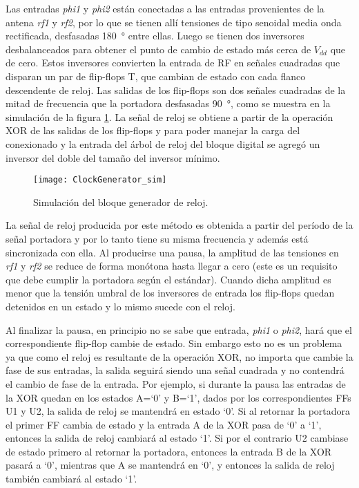 Las entradas \emph{phi1} y \emph{phi2} están conectadas a las entradas 
provenientes de la antena \emph{rf1} y \emph{rf2}, por lo que se 
tienen allí tensiones de tipo senoidal media onda rectificada, 
desfasadas \SI{180}{\degree} entre ellas. Luego se tienen dos 
inversores desbalanceados para obtener el punto de cambio de estado 
más cerca de \(V_{dd}\) que de cero. Estos inversores convierten la 
entrada de RF en señales cuadradas que disparan un par de flip-flops 
T, que cambian de estado con cada flanco descendente de reloj. Las
salidas de los flip-flops son dos señales cuadradas de la mitad de 
frecuencia que la portadora desfasadas \SI{90}{\degree}, como se 
muestra en la simulación de la figura \ref{fig:ClockGeneratorSim}. La 
señal de reloj se obtiene a partir de la operación XOR de las salidas 
de los flip-flops y para poder manejar la carga del conexionado y la 
entrada del árbol de reloj del bloque digital se agregó un inversor 
del doble del tamaño del inversor mínimo.

\begin{figure}
	\centering
	\texttt{[image: ClockGenerator\_sim]}
	\caption{Simulación del bloque generador de reloj.}
	\label{fig:ClockGeneratorSim}
\end{figure}

La señal de reloj producida por este método es obtenida a partir del 
período de la señal portadora y por lo tanto tiene su misma 
frecuencia y además está sincronizada con ella. Al producirse una 
pausa, la amplitud de las tensiones en \emph{rf1} y \emph{rf2} se reduce 
de forma monótona hasta llegar a cero (este es un requisito que debe 
cumplir la portadora según el estándar). Cuando dicha 
amplitud es menor que la tensión umbral de los inversores de 
entrada los flip-flops quedan detenidos en un estado y lo mismo sucede 
con el reloj. 

Al finalizar la pausa, en principio no se sabe que entrada, \emph{phi1} 
o \emph{phi2}, hará que el correspondiente flip-flop cambie 
de estado. Sin embargo esto no es un problema ya que como el reloj 
es resultante de la operación XOR, no importa que cambie la fase de 
sus entradas, la salida seguirá siendo una señal cuadrada y no 
contendrá el cambio de fase de la entrada. Por ejemplo, si durante la 
pausa las entradas de la XOR quedan en los estados A=`0' y B=`1', dados 
por los correspondientes FFs U1 y U2, la salida 
de reloj se mantendrá en estado `0'. Si al retornar la portadora el 
primer FF cambia de estado y la entrada A de la XOR pasa de `0' a `1', 
entonces la salida de reloj cambiará al estado `1'. Si por el 
contrario U2 cambiase de estado primero al retornar la portadora, 
entonces la entrada B de la XOR pasará a `0', mientras que A se 
mantendrá en `0', y entonces la salida de reloj también cambiará al 
estado `1'. 


